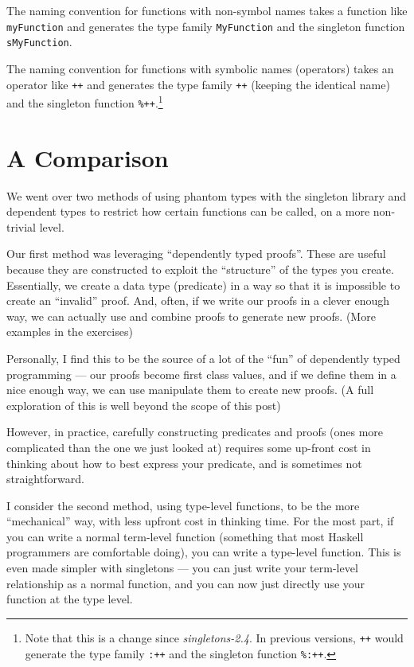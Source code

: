 \documentclass[]{article}
\begin{document}
The naming convention for functions with non-symbol names takes a function like
\texttt{myFunction} and generates the type family \texttt{MyFunction} and the
singleton function \texttt{sMyFunction}.

The naming convention for functions with symbolic names (operators) takes an
operator like \texttt{++} and generates the type family \texttt{++} (keeping the
identical name) and the singleton function \texttt{\%++}.\footnote{Note that
  this is a change since \emph{singletons-2.4}. In previous versions,
  \texttt{++} would generate the type family \texttt{:++} and the singleton
  function \texttt{\%:++}.}

\hypertarget{a-comparison}{%
\section{A Comparison}\label{a-comparison}}

We went over two methods of using phantom types with the singleton library and
dependent types to restrict how certain functions can be called, on a more
non-trivial level.

Our first method was leveraging ``dependently typed proofs''. These are useful
because they are constructed to exploit the ``structure'' of the types you
create. Essentially, we create a data type (predicate) in a way so that it is
impossible to create an ``invalid'' proof. And, often, if we write our proofs in
a clever enough way, we can actually use and combine proofs to generate new
proofs. (More examples in the exercises)

Personally, I find this to be the source of a lot of the ``fun'' of dependently
typed programming --- our proofs become first class values, and if we define
them in a nice enough way, we can use manipulate them to create new proofs. (A
full exploration of this is well beyond the scope of this post)

However, in practice, carefully constructing predicates and proofs (ones more
complicated than the one we just looked at) requires some up-front cost in
thinking about how to best express your predicate, and is sometimes not
straightforward.

I consider the second method, using type-level functions, to be the more
``mechanical'' way, with less upfront cost in thinking time. For the most part,
if you can write a normal term-level function (something that most Haskell
programmers are comfortable doing), you can write a type-level function. This is
even made simpler with singletons --- you can just write your term-level
relationship as a normal function, and you can now just directly use your
function at the type level.
\end{document}
